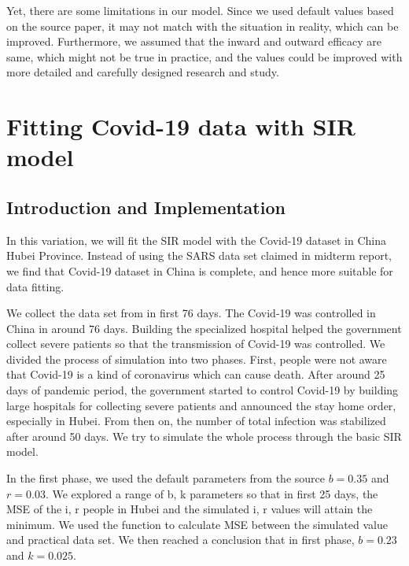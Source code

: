\documentclass{article}
\begin{document}
Yet, there are some limitations in our model. Since we used default values based on the source paper\cite{Steff2020mask}, it may not match with the situation in reality, which can be improved. Furthermore, we assumed that the inward and outward efficacy are same, which might not be true in practice, and the values could be improved with more detailed and carefully designed research and study. 






\section{Fitting Covid-19 data with SIR model}

\subsection{Introduction and Implementation}

In this variation, we will fit the SIR model with the Covid-19 dataset in China Hubei Province. Instead of using the SARS data set claimed in midterm report, we find that Covid-19 dataset in China is complete, and hence more suitable for data fitting. 

We collect the data set from \cite{Johnhopkins} in first 76 days. The Covid-19 was controlled in China in around 76 days. Building the specialized hospital helped the government collect severe patients so that the transmission of Covid-19 was controlled. We divided the process of simulation into two phases. First, people were not aware that Covid-19 is a kind of coronavirus which can cause death. After around 25 days of pandemic period, the government started to control Covid-19 by building large hospitals for collecting severe patients and announced the stay home order, especially in Hubei. From then on, the number of total infection was stabilized after around 50 days. We try to simulate the whole process through the basic SIR model. 

In the first phase, we used the default parameters from the source \cite{Cooper2020SIR} $b = 0.35$ and $r = 0.03$. We explored a range of b, k parameters so that in first 25 days, the MSE of the i, r people in Hubei and the simulated i, r values will attain the minimum. We used the function to calculate MSE between the simulated value and practical data set. We then reached a conclusion that in first phase, $b = 0.23$ and $k = 0.025$.
\end{document}
